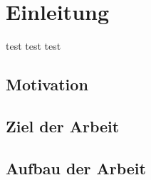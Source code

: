 \chapter{Einleitung}

test test test

\section{Motivation}

\section{Ziel der Arbeit}

\section{Aufbau der Arbeit}